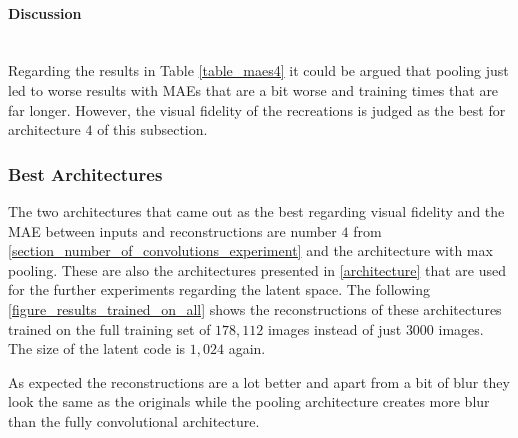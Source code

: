 \paragraph{Discussion} \mbox{} \\


Regarding the results in Table \autoref{table_maes4} it could be argued that pooling just led to worse results with
MAEs that are a bit worse and training times that are far longer. However, the visual fidelity of the recreations
is judged as the best for architecture $4$ of this subsection.


\subsubsection{Best Architectures}

The two architectures that came out as the best regarding visual fidelity and the MAE between inputs and 
reconstructions are number $4$ from \autoref{section_number_of_convolutions_experiment} and the architecture
with max pooling. These are also the architectures presented in \autoref{architecture} that are used
for the further experiments regarding the latent space. The following \autoref{figure_results_trained_on_all}
shows the reconstructions of these architectures trained on the full training set of $178,112$ images instead
of just $3000$ images. The size of the latent code is $1,024$ again.

As expected the reconstructions are a lot better and apart from a bit of blur they look the same as the originals
while the pooling architecture creates more blur than the fully convolutional architecture.

